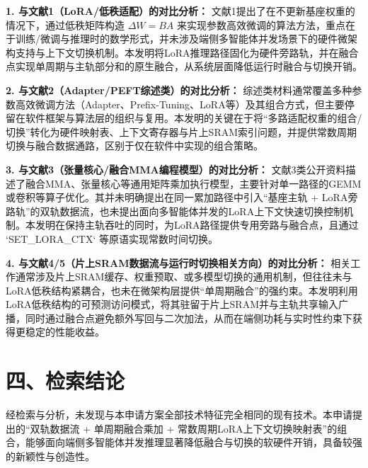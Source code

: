 \documentclass[12pt,a4paper]{article}
\begin{document}
\textbf{1. 与文献1（LoRA/低秩适配）的对比分析：}
文献1提出了在不更新基座权重的情况下，通过低秩矩阵构造 $\Delta W=BA$ 来实现参数高效微调的算法方法，重点在于训练/微调与推理时的数学形式，并未涉及端侧多智能体并发场景下的硬件微架构支持与上下文切换机制。本发明将LoRA推理路径固化为硬件旁路轨，并在融合点实现单周期与主轨部分和的原生融合，从系统层面降低运行时融合与切换开销。

\textbf{2. 与文献2（Adapter/PEFT综述类）的对比分析：}
综述类材料通常覆盖多种参数高效微调方法（Adapter、Prefix-Tuning、LoRA等）及其组合方式，但主要停留在软件框架与算法层的组织与复用。本发明的关键在于将“多路适配权重的组合/切换”转化为硬件映射表、上下文寄存器与片上SRAM索引问题，并提供常数周期切换与融合数据通路，区别于仅在软件中实现的组合策略。

\textbf{3. 与文献3（张量核心/融合MMA编程模型）的对比分析：}
文献3类公开资料描述了融合MMA、张量核心等通用矩阵乘加执行模型，主要针对单一路径的GEMM或卷积等算子优化。其并未明确提出在同一累加路径中引入“基座主轨 + LoRA旁路轨”的双轨数据流，也未提出面向多智能体并发的LoRA上下文快速切换控制机制。本发明在保持主轨吞吐的同时，为LoRA路径提供专用旁路与融合点，且通过 `SET\_LORA\_CTX` 等原语实现常数时间切换。

\textbf{4. 与文献4/5（片上SRAM数据流与运行时切换相关方向）的对比分析：}
相关工作通常涉及片上SRAM缓存、权重预取、或多模型切换的通用机制，但往往未与LoRA低秩结构紧耦合，也未在微架构层提供“单周期融合”的强约束。本发明利用LoRA低秩结构的可预测访问模式，将其驻留于片上SRAM并与主轨共享输入广播，同时通过融合点避免额外写回与二次加法，从而在端侧功耗与实时性约束下获得更稳定的性能收益。

\section*{四、检索结论}

经检索与分析，未发现与本申请方案全部技术特征完全相同的现有技术。本申请提出的“双轨数据流 + 单周期融合乘加 + 常数周期LoRA上下文切换映射表”的组合，能够面向端侧多智能体并发推理显著降低融合与切换的软硬件开销，具备较强的新颖性与创造性。
\end{document}
